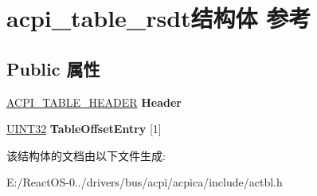 \hypertarget{structacpi__table__rsdt}{}\section{acpi\+\_\+table\+\_\+rsdt结构体 参考}
\label{structacpi__table__rsdt}
\subsection*{Public 属性}
\begin{DoxyCompactItemize}
\item 
\mbox{\label{structacpi__table__rsdt_a1b3707699b6a0a3283337ffcf8b277e9}} 
\hyperlink{structacpi__table__header}{A\+C\+P\+I\+\_\+\+T\+A\+B\+L\+E\+\_\+\+H\+E\+A\+D\+ER} {\bfseries Header}
\item 
\mbox{\label{structacpi__table__rsdt_aaf1131a99fcea144a43fae044b48a6a9}} 
\hyperlink{_processor_bind_8h_ae1e6edbbc26d6fbc71a90190d0266018}{U\+I\+N\+T32} {\bfseries Table\+Offset\+Entry} \mbox{[}1\mbox{]}
\end{DoxyCompactItemize}


该结构体的文档由以下文件生成\+:\begin{DoxyCompactItemize}
\item 
E\+:/\+React\+O\+S-\/0../drivers/bus/acpi/acpica/include/actbl.\+h\end{DoxyCompactItemize}
